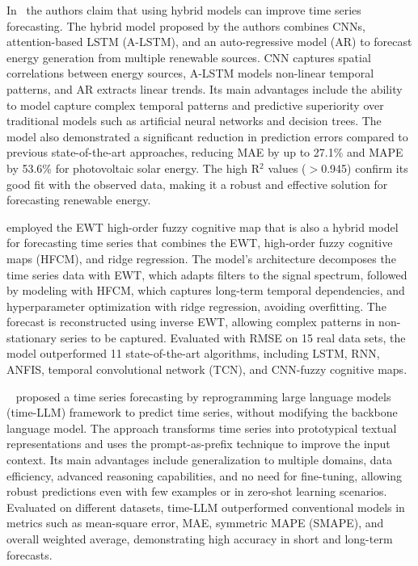 In~\citep{hybridTS2023} the authors claim that using hybrid models can improve time series forecasting. The hybrid model proposed by the authors combines CNNs, attention-based LSTM (A-LSTM), and an auto-regressive model (AR) to forecast energy generation from multiple renewable sources. CNN captures spatial correlations between energy sources, A-LSTM models non-linear temporal patterns, and AR extracts linear trends. Its main advantages include the ability to model capture complex temporal patterns and predictive superiority over traditional models such as artificial neural networks and decision trees. The model also demonstrated a significant reduction in prediction errors compared to previous state-of-the-art approaches, reducing MAE by up to 27.1\% and MAPE by 53.6\% for photovoltaic solar energy. The high R$^{2}$ values ($>$0.945) confirm its good fit with the observed data, making it a robust and effective solution for forecasting renewable energy.

\citet{emWavTS2023} employed the EWT high-order fuzzy cognitive map that is also a hybrid model for forecasting time series that combines the EWT, high-order fuzzy cognitive maps (HFCM), and ridge regression. The model's architecture decomposes the time series data with EWT, which adapts filters to the signal spectrum, followed by modeling with HFCM, which captures long-term temporal dependencies, and hyperparameter optimization with ridge regression, avoiding overfitting. The forecast is reconstructed using inverse EWT, allowing complex patterns in non-stationary series to be captured. Evaluated with RMSE on 15 real data sets, the model outperformed 11 state-of-the-art algorithms, including LSTM, RNN, ANFIS, temporal convolutional network (TCN), and CNN-fuzzy cognitive maps.

~\citet{timellmTS2024} proposed a time series forecasting by reprogramming large language models (time-LLM) framework to predict time series, without modifying the backbone language model. The approach transforms time series into prototypical textual representations and uses the prompt-as-prefix technique to improve the input context. Its main advantages include generalization to multiple domains, data efficiency, advanced reasoning capabilities, and no need for fine-tuning, allowing robust predictions even with few examples or in zero-shot learning scenarios. Evaluated on different datasets, time-LLM outperformed conventional models in metrics such as mean-square error, MAE, symmetric MAPE (SMAPE), and overall weighted average, demonstrating high accuracy in short and long-term forecasts.


